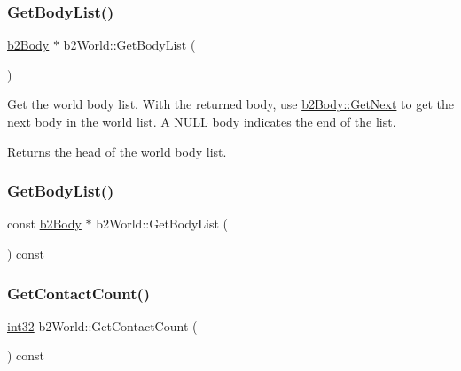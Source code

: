 \subsubsection{\texorpdfstring{GetBodyList()}{GetBodyList()}\hspace{0.1cm}{\footnotesize\ttfamily [1/2]}}
{\footnotesize\ttfamily \mbox{\hyperlink{classb2_body}{b2\+Body}} $\ast$ b2\+World\+::\+Get\+Body\+List (\begin{DoxyParamCaption}{ }\end{DoxyParamCaption})\hspace{0.3cm}{\ttfamily [inline]}}

Get the world body list. With the returned body, use \mbox{\hyperlink{classb2_body_ad54182a11d02362b027a0eb072775bdc}{b2\+Body\+::\+Get\+Next}} to get the next body in the world list. A N\+U\+LL body indicates the end of the list. \begin{DoxyReturn}{Returns}
the head of the world body list. 
\end{DoxyReturn}
\mbox{\label{classb2_world_a8afde497a719bb1507fdfb474e79881a}} 
\subsubsection{\texorpdfstring{GetBodyList()}{GetBodyList()}\hspace{0.1cm}{\footnotesize\ttfamily [2/2]}}
{\footnotesize\ttfamily const \mbox{\hyperlink{classb2_body}{b2\+Body}} $\ast$ b2\+World\+::\+Get\+Body\+List (\begin{DoxyParamCaption}{ }\end{DoxyParamCaption}) const\hspace{0.3cm}{\ttfamily [inline]}}

\mbox{\label{classb2_world_aa47375fc3ca9f09d0350c61cfeabcee9}} 
\subsubsection{\texorpdfstring{GetContactCount()}{GetContactCount()}}
{\footnotesize\ttfamily \mbox{\hyperlink{b2_settings_8h_a43d43196463bde49cb067f5c20ab8481}{int32}} b2\+World\+::\+Get\+Contact\+Count (\begin{DoxyParamCaption}{ }\end{DoxyParamCaption}) const\hspace{0.3cm}{\ttfamily [inline]}}



